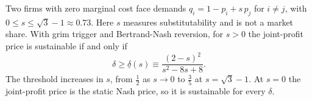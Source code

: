 \begin{proposition}\label{prop:12-diffprod}
Two firms with zero marginal cost face demands $q_i = 1 - p_i + s\,p_j$ for $i \ne j$, with
$0 \le s \le \sqrt 3 - 1 \approx 0.73$. Here $s$ measures substitutability and is not a market share. With grim
trigger and Bertrand-Nash reversion, for $s > 0$ the joint-profit price is sustainable if and only if
\begin{equation}\label{eq:12-diffprod-delta}
\delta \ge \underline\delta(s) \equiv \frac{(2 - s)^2}{s^2 - 8s + 8} .
\end{equation}
The threshold increases in $s$, from $\frac{1}{2}$ as $s \to 0$ to $\frac{3}{5}$ at $s = \sqrt 3 - 1$. At $s = 0$ the
joint-profit price is the static Nash price, so it is sustainable for every $\delta$.
\end{proposition}

